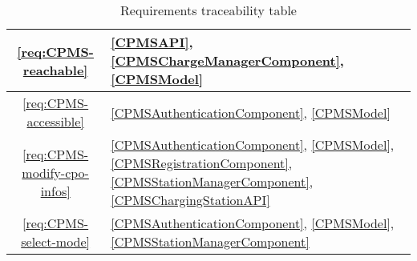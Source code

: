 \begin{table}[h]
\begin{center}
\begin{tabular}{|c||p{15.5cm}|}
            \hline
            \ref{req:CPMS-reachable}             &
            \ref{CPMSAPI},
            \ref{CPMSChargeManagerComponent},
            \ref{CPMSModel}
            \\
            \hline
            \ref{req:CPMS-accessible}            &
            \ref{CPMSAuthenticationComponent},
            \ref{CPMSModel}
            \\
            \hline
            \ref{req:CPMS-modify-cpo-infos}      &
            \ref{CPMSAuthenticationComponent},
            \ref{CPMSModel},
            \ref{CPMSRegistrationComponent},
            \ref{CPMSStationManagerComponent},
            \ref{CPMSChargingStationAPI}
            \\
            \hline
            \ref{req:CPMS-select-mode}           &
            \ref{CPMSAuthenticationComponent},
            \ref{CPMSModel},
            \ref{CPMSStationManagerComponent}
            \\
            \hline
        \end{tabular}
    \end{center}
    \caption{Requirements traceability table}
    \label{requirements-traceability-table}
\end{table}


